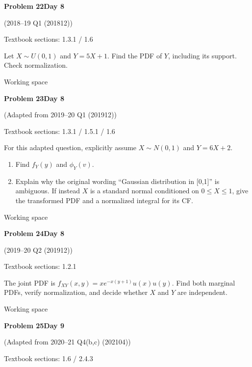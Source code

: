 \documentclass[11pt]{article}
\newcommand{\qtitle}[2]{\clearpage\begin{tcolorbox}[colback=navy,colframe=navy,arc=1.5pt,boxrule=0pt]\color{white}\large\bfseries #1\hfill\small #2\end{tcolorbox}}
\begin{document}
\qtitle{Problem 22}{Day 8}
{\small\color{accentred}(2018--19 Q1 (201812))}\par\smallskip
{\small\color{muted}Textbook sections: 1.3.1 / 1.6}\par\medskip
\begin{tcolorbox}[colback=qbg,colframe=qbg,boxrule=0pt]Let $X\sim U(0,1)$ and $Y=5X+1$. Find the PDF of $Y$, including its support. Check normalization.\end{tcolorbox}\smallskip\begin{workspace}\hfill{\color{linec}\footnotesize Working space}\end{workspace}
\qtitle{Problem 23}{Day 8}
{\small\color{accentred}(Adapted from 2019--20 Q1 (201912))}\par\smallskip
{\small\color{muted}Textbook sections: 1.3.1 / 1.5.1 / 1.6}\par\medskip
\begin{tcolorbox}[colback=qbg,colframe=qbg,boxrule=0pt]For this adapted question, explicitly assume $X\sim N(0,1)$ and $Y=6X+2$.
\begin{enumerate}\item Find $f_Y(y)$ and $\phi_Y(v)$.\item Explain why the original wording ``Gaussian distribution in [0,1]'' is ambiguous. If instead $X$ is a standard normal conditioned on $0\le X\le1$, give the transformed PDF and a normalized integral for its CF.\end{enumerate}\end{tcolorbox}\smallskip\begin{workspace}\hfill{\color{linec}\footnotesize Working space}\end{workspace}
\qtitle{Problem 24}{Day 8}
{\small\color{accentred}(2019--20 Q2 (201912))}\par\smallskip
{\small\color{muted}Textbook sections: 1.2.1}\par\medskip
\begin{tcolorbox}[colback=qbg,colframe=qbg,boxrule=0pt]The joint PDF is $f_{XY}(x,y)=xe^{-x(y+1)}u(x)u(y)$. Find both marginal PDFs, verify normalization, and decide whether $X$ and $Y$ are independent.\end{tcolorbox}\smallskip\begin{workspace}\hfill{\color{linec}\footnotesize Working space}\end{workspace}
\qtitle{Problem 25}{Day 9}
{\small\color{accentred}(Adapted from 2020--21 Q4(b,c) (202104))}\par\smallskip
{\small\color{muted}Textbook sections: 1.6 / 2.4.3}\par\medskip
\end{document}

